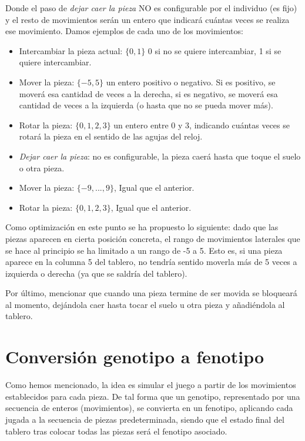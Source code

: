 \documentclass[11pt,spanish,listoffigures,listoftables]{tfgetsinf}
\begin{document}
Donde el paso de \textit{dejar caer la pieza} NO es configurable por el individuo (es fijo) y el resto de movimientos serán un entero que indicará cuántas veces se realiza ese movimiento. Damos ejemplos de cada uno de los movimientos:
\begin{itemize}
    \item Intercambiar la pieza actual: $\{0, 1\}$ 0 si no se quiere intercambiar, 1 si se quiere intercambiar.
    \item Mover la pieza: $\{-5, 5\}$ un entero positivo o negativo. Si es positivo, se moverá esa cantidad de veces a la derecha, si es negativo, se moverá esa cantidad de veces a la izquierda (o hasta que no se pueda mover más).
    \item Rotar la pieza: $\{0, 1, 2, 3\}$ un entero entre 0 y 3, indicando cuántas veces se rotará la pieza en el sentido de las agujas del reloj.
    \item \textit{Dejar caer la pieza}: no es configurable, la pieza caerá hasta que toque el suelo o otra pieza.
    \item Mover la pieza: $\{-9, ..., 9\}$, Igual que el anterior.
    \item Rotar la pieza: $\{0, 1, 2, 3\}$, Igual que el anterior.
\end{itemize}

Como optimización en este punto se ha propuesto lo siguiente: dado que las piezas aparecen en cierta posición concreta, el rango de movimientos laterales que se hace al principio se ha limitado a un rango de -5 a 5. Esto es, si una pieza aparece en la columna 5 del tablero, no tendría sentido moverla más de 5 veces a izquierda o derecha (ya que se saldría del tablero).

Por último, mencionar que cuando una pieza termine de ser movida se bloqueará al momento, dejándola caer hasta tocar el suelo u otra pieza y añadiéndola al tablero.

\section{Conversión genotipo a fenotipo}
Como hemos mencionado, la idea es simular el juego a partir de los movimientos establecidos para cada pieza. De tal forma que un genotipo, representado por una secuencia de enteros (movimientos), se convierta en un fenotipo, aplicando cada jugada a la secuencia de piezas predeterminada, siendo que el estado final del tablero tras colocar todas las piezas será el fenotipo asociado.
\end{document}
